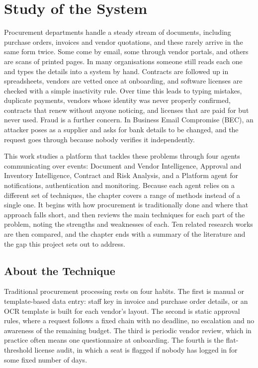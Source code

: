 
\chapter{Study of the System} \label{chap2}
\newpage

Procurement departments handle a steady stream of documents, including purchase orders, invoices and vendor quotations, and these rarely arrive in the same form twice. Some come by email, some through vendor portals, and others are scans of printed pages. In many organisations someone still reads each one and types the details into a system by hand. Contracts are followed up in spreadsheets, vendors are vetted once at onboarding, and software licenses are checked with a simple inactivity rule. Over time this leads to typing mistakes, duplicate payments, vendors whose identity was never properly confirmed, contracts that renew without anyone noticing, and licenses that are paid for but never used. Fraud is a further concern. In Business Email Compromise (BEC), an attacker poses as a supplier and asks for bank details to be changed, and the request goes through because nobody verifies it independently.

This work studies a platform that tackles these problems through four agents communicating over events: Document and Vendor Intelligence, Approval and Inventory Intelligence, Contract and Risk Analysis, and a Platform agent for notifications, authentication and monitoring. Because each agent relies on a different set of techniques, the chapter covers a range of methods instead of a single one. It begins with how procurement is traditionally done and where that approach falls short, and then reviews the main techniques for each part of the problem, noting the strengths and weaknesses of each. Ten related research works are then compared, and the chapter ends with a summary of the literature and the gap this project sets out to address.

\section{About the Technique}

Traditional procurement processing rests on four habits. The first is manual or template-based data entry: staff key in invoice and purchase order details, or an OCR template is built for each vendor's layout. The second is static approval rules, where a request follows a fixed chain with no deadline, no escalation and no awareness of the remaining budget. The third is periodic vendor review, which in practice often means one questionnaire at onboarding. The fourth is the flat-threshold license audit, in which a seat is flagged if nobody has logged in for some fixed number of days.

